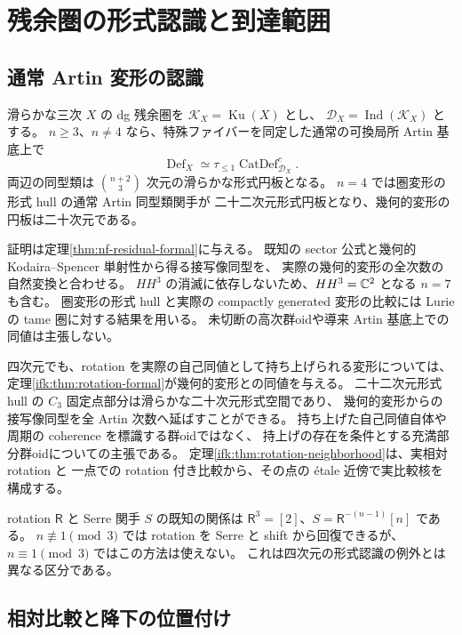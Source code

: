 \section{残余圏の形式認識と到達範囲}
\label{real:sec:scope}
\subsection{通常 Artin 変形の認識}
\begin{maintheorem}
滑らかな三次 $X$ の dg 残余圏を $\mathcal K_X=\operatorname{Ku}(X)$ とし、
$\mathcal D_X=\operatorname{Ind}(\mathcal K_X)$ とする。
$n\ge3$、$n\ne4$ なら、特殊ファイバーを同定した通常の可換局所 Artin 基底上で
\[
 \operatorname{Def}_X\simeq
 \tau_{\le1}\operatorname{CatDef}^{c}_{\mathcal D_X}.
\]
両辺の同型類は $\binom{n+2}{3}$ 次元の滑らかな形式円板となる。
$n=4$ では圏変形の形式 hull の通常 Artin 同型類関手が
二十二次元形式円板となり、幾何的変形の円板は二十次元である。
\end{maintheorem}

証明は定理\ref{thm:nf-residual-formal}に与える。
既知の sector 公式と幾何的 Kodaira--Spencer 単射性から得る接写像同型を、
実際の幾何的変形の全次数の自然変換と合わせる。
$HH^3$ の消滅に依存しないため、$HH^3=\mathbb C^2$ となる $n=7$ も含む。
圏変形の形式 hull と実際の compactly generated 変形の比較には
Lurie \cite{NFDAGX} の tame 圏に対する結果を用いる。
未切断の高次群oidや導来 Artin 基底上での同値は主張しない。

四次元でも、rotation を実際の自己同値として持ち上げられる変形については、
定理\ref{ifk:thm:rotation-formal}が幾何的変形との同値を与える。
二十二次元形式 hull の $C_3$ 固定点部分は滑らかな二十次元形式空間であり、
幾何的変形からの接写像同型を全 Artin 次数へ延ばすことができる。
持ち上げた自己同値自体や周期の coherence を標識する群oidではなく、
持上げの存在を条件とする充満部分群oidについての主張である。
定理\ref{ifk:thm:rotation-neighborhood}は、実相対 rotation と
一点での rotation 付き比較から、その点の \'etale 近傍で実比較核を構成する。

rotation $\mathsf R$ と Serre 関手 $S$ の既知の関係は
$\mathsf R^3=[2]$、$S=\mathsf R^{-(n-1)}[n]$ である。
$n\not\equiv1\pmod3$ では rotation を Serre と shift から回復できるが、
$n\equiv1\pmod3$ ではこの方法は使えない。
これは四次元の形式認識の例外とは異なる区分である。


\subsection{相対比較と降下の位置付け}

